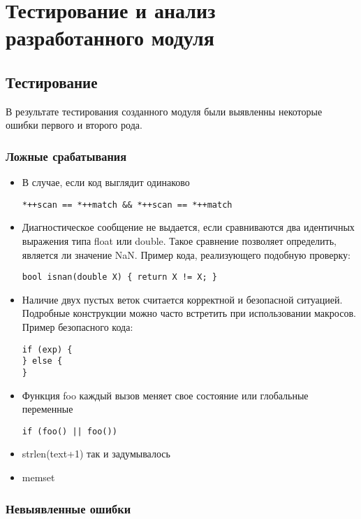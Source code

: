 \chapter{Тестирование и анализ разработанного модуля}

\section{Тестирование}
В результате тестирования созданного модуля были выявленны некоторые ошибки первого и второго рода. 

\subsection*{Ложные срабатывания}
\begin{itemize}
	\item В случае, если код выглядит одинаково 
\begin{lstlisting}
*++scan == *++match && *++scan == *++match
\end{lstlisting}

	\item 
Диагностическое сообщение не выдается, если сравниваются два идентичных выражения типа float или double. 
Такое сравнение позволяет определить, является ли значение NaN. Пример кода, реализующего подобную проверку:
\begin{lstlisting}
bool isnan(double X) { return X != X; }
\end{lstlisting}

	\item
Наличие двух пустых веток считается корректной и безопасной ситуацией. Подробные конструкции 
можно часто встретить при использовании макросов. Пример безопасного кода:
\begin{lstlisting}
if (exp) {
} else {
}
\end{lstlisting}

	\item Функция foo каждый вызов меняет свое состояние или глобальные переменные 
\begin{lstlisting}
if (foo() || foo())
\end{lstlisting}
	
	\item strlen(text+1) так и задумывалось
	
	\item memset 
	
\end{itemize}

\subsection*{Невыявленные ошибки}


